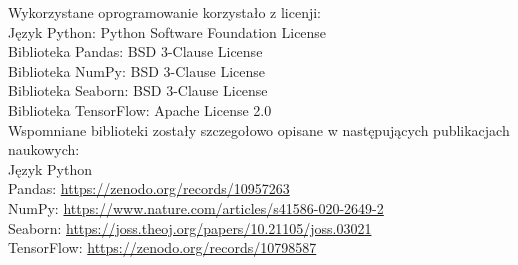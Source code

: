 \noindent
Wykorzystane oprogramowanie korzystało z licenji:\\
\indent Język Python: Python Software Foundation License \cite{python}\\
\indent Biblioteka Pandas: BSD 3-Clause License \cite{pandas}\\
\indent Biblioteka NumPy: BSD 3-Clause License \cite{numpy}\\
\indent Biblioteka Seaborn: BSD 3-Clause License \cite{seaborn}\\
\indent Biblioteka TensorFlow: Apache License 2.0 \cite{tensorflow}\\

\noindent
Wspomniane biblioteki zostały szczegołowo opisane w następujących publikacjach naukowych:\\
\indent Język Python \cite{python_paper}\\
\indent Pandas: \url{https://zenodo.org/records/10957263} \cite{pandas_paper}\\
\indent NumPy: \url{https://www.nature.com/articles/s41586-020-2649-2} \cite{numpy_paper}\\
\indent Seaborn: \url{https://joss.theoj.org/papers/10.21105/joss.03021} \cite{seaborn_paper}\\
\indent TensorFlow: \url{https://zenodo.org/records/10798587} \cite{tensorflow_paper}\\

